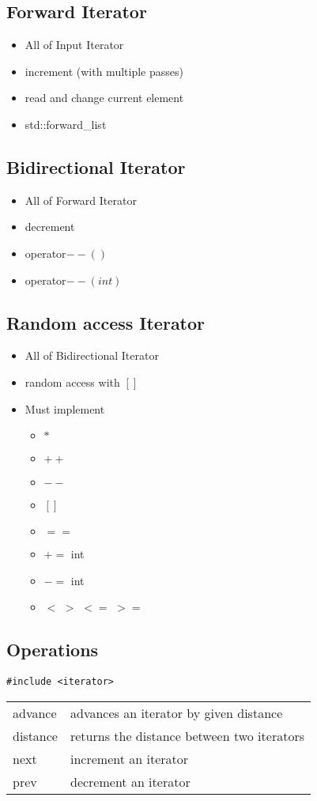 \subsection{Forward Iterator}
\begin{itemize}
	\item All of Input Iterator
	\item increment (with multiple passes)
	\item read and change current element
	\item std::forward\_list
\end{itemize}

\subsection{Bidirectional Iterator}
\begin{itemize}
	\item All of Forward Iterator
	\item decrement
	\item operator$--()$
	\item operator$--(int)$
\end{itemize}

\subsection{Random access Iterator}
\begin{itemize}
	\item All of Bidirectional Iterator
	\item random access with $[]$
	\item Must implement
	\begin{itemize}
		\item $*$
		\item $++$
		\item $--$
		\item $[]$
		\item $==$
		\item $+=$ int
		\item $-=$ int
		\item $<$ $>$ $<=$ $>=$
	\end{itemize}
\end{itemize}

\subsection{Operations}
\begin{lstlisting}
#include <iterator>
\end{lstlisting}
\begin{tabularx}{\columnwidth}{lX}
	advance  & advances an iterator by given distance \\
	distance & returns the distance between two iterators \\
	next     & increment an iterator \\
	prev     & decrement an iterator \\
\end{tabularx}

